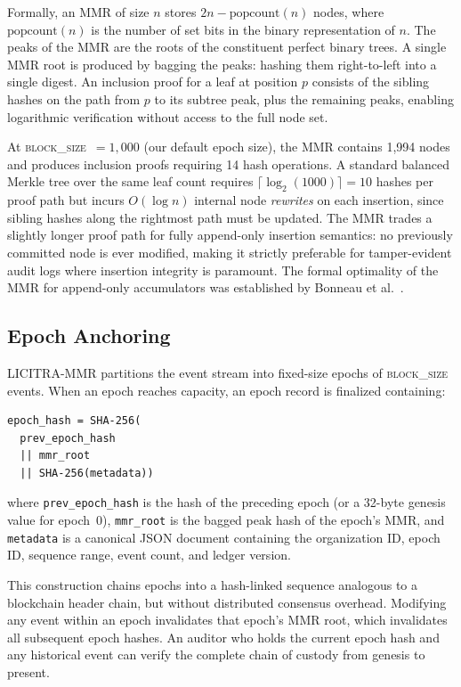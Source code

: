 \documentclass[sigconf,natbib=false]{acmart}
\begin{document}
Formally, an MMR of size $n$ stores $2n - \text{popcount}(n)$ nodes, where
$\text{popcount}(n)$ is the number of set bits in the binary representation
of $n$. The peaks of the MMR are the roots of the constituent perfect binary
trees. A single MMR root is produced by bagging the peaks: hashing them
right-to-left into a single digest. An inclusion proof for a leaf at
position $p$ consists of the sibling hashes on the path from $p$ to its
subtree peak, plus the remaining peaks, enabling logarithmic verification
without access to the full node set.

At \textsc{block\_size}~$= 1{,}000$ (our default epoch size), the MMR
contains 1,994 nodes and produces inclusion proofs requiring 14
hash operations. A standard balanced Merkle tree over the same leaf count
requires $\lceil\log_2(1000)\rceil = 10$ hashes per proof path but incurs
$O(\log n)$ internal node \emph{rewrites} on each insertion, since
sibling hashes along the rightmost path must be updated. The MMR trades a
slightly longer proof path for fully append-only insertion semantics: no
previously committed node is ever modified, making it strictly preferable
for tamper-evident audit logs where insertion integrity is paramount. The
formal optimality of the MMR for append-only accumulators was established
by Bonneau et al.~\cite{bonneau2025}.

\subsection{Epoch Anchoring}

LICITRA-MMR partitions the event stream into fixed-size epochs of
\textsc{block\_size} events. When an epoch reaches capacity, an epoch
record is finalized containing:

\begin{lstlisting}
epoch_hash = SHA-256(
  prev_epoch_hash
  || mmr_root
  || SHA-256(metadata))
\end{lstlisting}

where \texttt{prev\_epoch\_hash} is the hash of the preceding epoch (or a
32-byte genesis value for epoch~0), \texttt{mmr\_root} is the bagged peak
hash of the epoch's MMR, and \texttt{metadata} is a canonical JSON document
containing the organization ID, epoch ID, sequence range, event count, and
ledger version.

This construction chains epochs into a hash-linked sequence analogous to a
blockchain header chain, but without distributed consensus overhead.
Modifying any event within an epoch invalidates that epoch's MMR root,
which invalidates all subsequent epoch hashes. An auditor who holds the
current epoch hash and any historical event can verify the complete chain
of custody from genesis to present.
\end{document}
